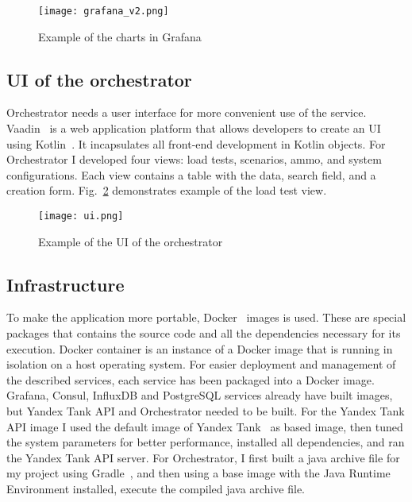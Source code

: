 \begin{figure}[t]
    \centering
    \texttt{[image: grafana\_v2.png]}
    \caption{Example of the charts in Grafana}
    \label{fig:grafana}
\end{figure}

\subsection{UI of the orchestrator}\label{subsec:ui-of-the-orchestrator}
Orchestrator needs a user interface for more convenient use of the service. Vaadin~\cite{vaadin} is a web application platform that allows developers to create an UI using Kotlin~\cite{kotlin}. It incapsulates all front-end development in Kotlin objects. For Orchestrator I developed four views: load tests, scenarios, ammo, and system configurations. Each view contains a table with the data, search field, and a creation form. Fig.~\ref{fig:ui} demonstrates example of the load test view.

\begin{figure}[t]
    \centering
    \texttt{[image: ui.png]}
    \caption{Example of the UI of the orchestrator}
    \label{fig:ui}
\end{figure}

\subsection{Infrastructure}\label{subsec:infrastructure}
To make the application more portable, Docker~\cite{docker_start} images is used. These are special packages that contains the source code and all the dependencies necessary for its execution.
Docker container is an instance of a Docker image that is running in isolation on a host operating system.
For easier deployment and management of the described services, each service has been packaged into a Docker image. Grafana, Consul, InfluxDB and PostgreSQL services already have built images, but Yandex Tank API and Orchestrator needed to be built. For the Yandex Tank API image I used the default image of Yandex Tank~\cite{yandex_tank_image} as based image, then tuned the system parameters for better performance, installed all dependencies, and ran the Yandex Tank API server. For Orchestrator, I first built a java archive file for my project using Gradle~\cite{gradle}, and then using a base image with the Java Runtime Environment installed, execute the compiled java archive file.

